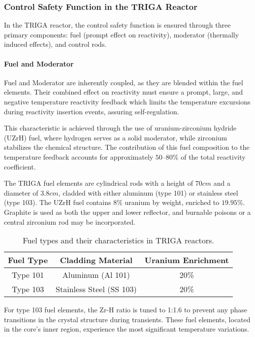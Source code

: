 \subsubsection{Control Safety Function in the TRIGA Reactor}

In the TRIGA reactor, the control safety function is ensured through three primary components: fuel (prompt effect on reactivity), moderator (thermally induced effects), and control rods.

\paragraph{Fuel and Moderator} Fuel and Moderator are inherently coupled, as they are blended within the fuel elements. Their combined effect on reactivity must ensure a prompt, large, and negative temperature reactivity feedback which limits the temperature excursions during reactivity insertion events, assuring self-regulation.

This characteristic is achieved through the use of uranium-zirconium hydride (UZrH) fuel, where hydrogen serves as a solid moderator, while zirconium stabilizes the chemical structure. The contribution of this fuel composition to the temperature feedback accounts for approximately $50–80\%$ of the total reactivity coefficient.

The TRIGA fuel elements are cylindrical rods with a height of $70 cm$ and a diameter of $3.8 cm$, cladded with either aluminum (type 101) or stainless steel (type 103). The UZrH fuel contains $8\%$ uranium by weight, enriched to $19.95\%$. Graphite is used as both the upper and lower reflector, and burnable poisons or a central zirconium rod may be incorporated.

\begin{table}[H]
    \centering
    \begin{tabular}{|c|c|c|}
        \hline
        \textbf{Fuel Type} & \textbf{Cladding Material} & \textbf{Uranium Enrichment} \\
        \hline
        Type 101 & Aluminum (Al 101) & 20\% \\
        Type 103 & Stainless Steel (SS 103) & 20\% \\
        \hline
    \end{tabular}
    \caption{Fuel types and their characteristics in TRIGA reactors.}
    \label{tab:fuel_types}
\end{table}

For type 103 fuel elements, the Zr-H ratio is tuned to 1:1.6 to prevent any phase transitions in the crystal structure during transients. These fuel elements, located in the core's inner region, experience the most significant temperature variations.

